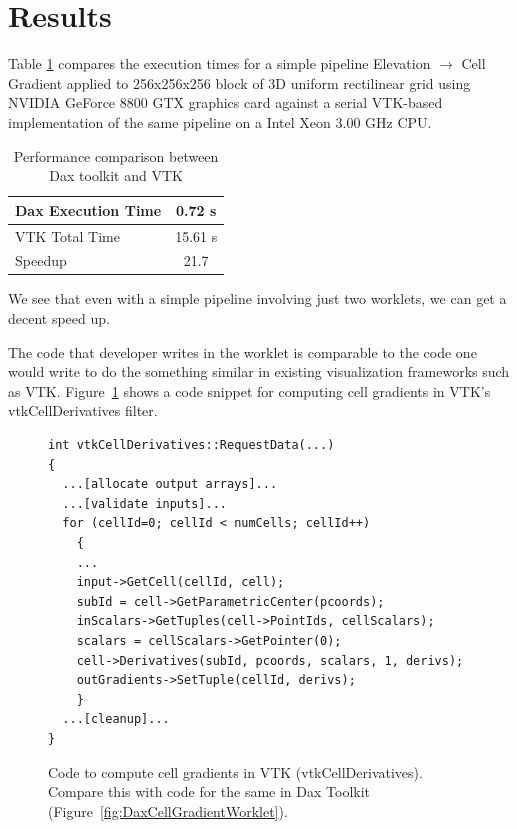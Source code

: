\documentclass{vgtc}                          %
\begin{document}
\section{Results}
\label{sec:Results}

Table \ref{tab:Results} compares the execution times for a simple pipeline
Elevation $\rightarrow$ Cell Gradient applied to 256x256x256 block of 3D uniform
rectilinear grid using NVIDIA GeForce 8800 GTX graphics card against a serial VTK-based
implementation of the same pipeline on a Intel Xeon 3.00 GHz CPU.

\begin{table}[htbp]
  \centering
  \label{tab:Results}
  \begin{tabular}{|l||c|}
    \hline
    Dax Execution Time & 0.72 s \\
    \hline
    VTK Total Time & 15.61 s \\
    \hline
    \hline
    Speedup & 21.7 \\
    \hline
  \end{tabular}
  \caption{Performance comparison between Dax toolkit and VTK}
\end{table}

We see that even with a simple pipeline involving just two worklets, we can
get a decent speed up.

The code that developer writes in the worklet is comparable to the code
one would write to do the something similar in existing visualization frameworks
such as VTK. Figure~\ref{fig:VTKCellGradient} shows a code snippet for computing
cell gradients in VTK's vtkCellDerivatives filter.

\begin{figure}[htbp]
\centering
{\small
\begin{verbatim}
int vtkCellDerivatives::RequestData(...)
{
  ...[allocate output arrays]...
  ...[validate inputs]...
  for (cellId=0; cellId < numCells; cellId++)
    {
    ...
    input->GetCell(cellId, cell);
    subId = cell->GetParametricCenter(pcoords);
    inScalars->GetTuples(cell->PointIds, cellScalars);
    scalars = cellScalars->GetPointer(0);
    cell->Derivatives(subId, pcoords, scalars, 1, derivs);
    outGradients->SetTuple(cellId, derivs);
    }
  ...[cleanup]...
}
\end{verbatim}
}
\caption{Code to compute cell gradients in VTK (vtkCellDerivatives). Compare
this with code for the same in Dax Toolkit
(Figure~\ref{fig:DaxCellGradientWorklet}).}
\label{fig:VTKCellGradient}
\end{figure}
\end{document}
